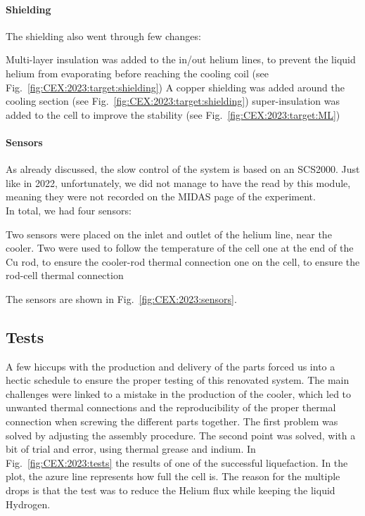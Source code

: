 \begin{refsection}
        \paragraph{Shielding} The shielding also went through few changes:
        \begin{outline}
            \1 Multi-layer insulation was added to the in/out helium lines, to prevent the liquid helium from evaporating before reaching the cooling coil (see Fig.~\ref{fig:CEX:2023:target:shielding})
            \1 A copper shielding was added around the cooling section (see Fig.~\ref{fig:CEX:2023:target:shielding})
            \1 super-insulation was added to the cell to improve the stability (see Fig.~\ref{fig:CEX:2023:target:ML})
        \end{outline}

        \paragraph{Sensors} As already discussed, the slow control of the system is based on an SCS2000.
        Just like in 2022, unfortunately, we did not manage to have the \lakeshore read by this module, meaning they were not recorded on the MIDAS page of the experiment.\\
        In total, we had four \lakeshore sensors:
        \begin{outline}
            \1 Two sensors were placed on the inlet and outlet of the helium line, near the cooler.
            \1 Two were used to follow the temperature of the cell
                \2 one at the end of the Cu rod, to ensure the cooler-rod thermal connection
                \2 one on the cell, to ensure the rod-cell thermal connection 
        \end{outline}
        The sensors are shown in Fig.~\ref{fig:CEX:2023:sensors}.

    \subsection{Tests}
        A few hiccups with the production and delivery of the parts forced us into a hectic schedule to ensure the proper testing of this renovated system.
        The main challenges were linked to a mistake in the production of the cooler, which led to unwanted thermal connections and the reproducibility of the proper thermal connection when screwing the different parts together.
        The first problem was solved by adjusting the assembly procedure. The second point was solved, with a bit of trial and error, using thermal grease and indium.
        In Fig.~\ref{fig:CEX:2023:tests} the results of one of the successful liquefaction. 
        In the plot, the azure line represents how full the cell is. 
        The reason for the multiple drops is that the test was to reduce the Helium flux while keeping the liquid Hydrogen.


\end{refsection}
